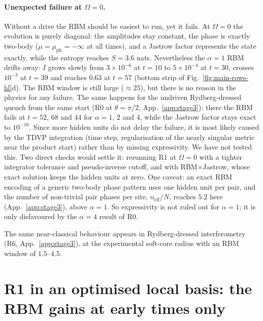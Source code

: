 \documentclass[11pt,a4paper]{article}
\newcommand{\inff}{I}
\begin{document}
\paragraph{Unexpected failure at $\Omega=0$.} Without a drive the RBM should be easiest to run, yet it fails.
At $\Omega=0$ the evolution is purely diagonal: the amplitudes stay constant, the phase is exactly two-body
($\mu=\mu_{\mathrm{ph}}=-\infty$ at all times), and a Jastrow factor represents the state exactly, while the entropy
reaches $S=3.6$ nats. Nevertheless the $\alpha=1$ RBM drifts away: $\inff$ grows slowly from
$3\times10^{-6}$ at $t=10$ to $5\times10^{-4}$ at $t=30$, crosses $10^{-3}$ at $t=39$ and reaches $0.63$ at $t=57$
(bottom strip of Fig.~\ref{fig:main-rows-hl}d). The RBM window is still large ($\approx25$), but there is no reason in
the physics for any failure. The same happens for the undriven Rydberg-dressed quench from the same start (R0 at
$\theta=\pi/2$, App.~\ref{app:stage3}): there the RBM fails at $t=52$, $68$ and $44$ for $\alpha=1$, $2$ and $4$, while
the Jastrow factor stays exact to $10^{-16}$. Since more hidden units do not delay the failure, it is most likely
caused by the TDVP integration (time step, regularisation of the nearly singular metric near the product start)
rather than by missing expressivity. We have not tested this. Two direct checks would settle it: rerunning R1 at
$\Omega=0$ with a tighter integrator tolerance and pseudo-inverse cutoff, and with RBM$\times$Jastrow, whose exact
solution keeps the hidden units at zero. One caveat: an exact RBM encoding of a generic two-body phase pattern
uses one hidden unit per pair, and the number of non-trivial pair phases per site, $n_{\mathrm{eff}}/N$, reaches $5.2$
here (App.~\ref{app:stage3}), above $\alpha=1$. So expressivity is not ruled out for $\alpha=1$; it is only
disfavoured by the $\alpha=4$ result of R0.

The same near-classical behaviour appears in Rydberg-dressed interferometry (R6, App.~\ref{app:stage3}), at the
experimental soft-core radius with an RBM window of $1.5$--$4.5$.

\section{R1 in an optimised local basis: the RBM gains at early times only}
\label{sec:basis}
\end{document}
